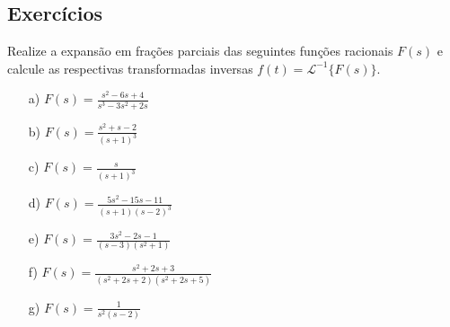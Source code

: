 \subsection*{Exercícios}


\begin{exer}{\label{frac_parciais}} Realize a expansão em frações parciais das seguintes funções racionais $F(s)$ e calcule as respectivas transformadas inversas $f(t)=\mathcal{L}^{-1}\{F(s)\}$.
\begin{itemize}
\item[a)]$F(s)=\frac{s^2-6s+4}{s^3-3s^2+2s}$
\item[b)]$F(s)=\frac{s^2+s-2}{(s+1)^3}$
\item[c)]$F(s)=\frac{s}{(s+1)^3}$
\item[d)]$F(s)=\frac{5s^2-15s-11}{(s+1)(s-2)^3}$
\item[e)]$F(s)=\frac{3s^2-2s-1}{(s-3)(s^2+1)}$
\item[f)]$F(s)=\frac{s^2+2s+3}{(s^2+2s+2)(s^2+2s+5)}$
\item[g)]$F(s)=\frac{1}{s^2(s-2)}$
\end{itemize}
\end{exer}
